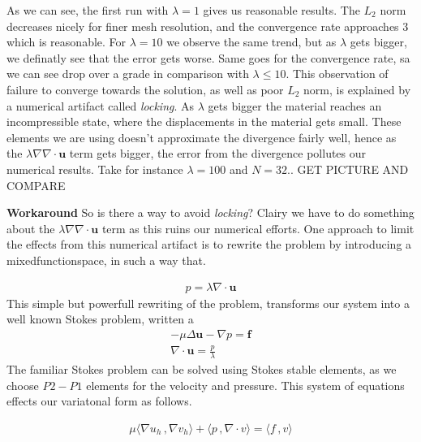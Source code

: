 \documentclass[a4paper,norsk]{article}
\begin{document}
As we can see, the first run with $\lambda = 1$ gives us reasonable results. The $L_2$ norm decreases nicely for finer mesh
resolution, and the convergence rate approaches 3 which is reasonable. For $\lambda = 10$ we observe the same trend, but as $\lambda$ gets bigger, we definatly see that the error gets worse. Same goes for the convergence rate, sa we can see drop over 
a grade in comparison with $\lambda \leq 10$. This observation of failure to converge towards the solution, as well as poor $L_2$ norm, is explained by a numerical artifact called \textit{locking}. As $\lambda$ gets bigger the material reaches an 
incompressible state, where the displacements in the material gets small.
These elements we are using doesn't approximate the divergence fairly well, hence as the 
$\lambda \nabla \nabla \cdot \textbf{u}$ term gets bigger, the error from the divergence pollutes our numerical results. Take for 
instance $\lambda = 100$ and $N = 32$.. GET PICTURE AND COMPARE


\textbf{Workaround}
So is there a way to avoid \textit{locking}? Clairy we have to do something about the $\lambda \nabla \nabla \cdot \textbf{u}$ term as this ruins our numerical efforts.
One approach to limit the effects from this numerical artifact is to rewrite
the problem by introducing a mixedfunctionspace, in such a way that.

\begin{align*}
p =  \lambda \nabla \cdot \textbf{u} 
\end{align*}
This simple but powerfull rewriting of the problem, transforms our system into a well known Stokes problem, written a
\begin{align*}
-\mu \Delta \textbf{u} - \nabla p = \textbf{f} \\
\nabla \cdot \textbf{u} = \frac{p}{\lambda}
\end{align*}
The familiar Stokes problem can be solved using Stokes stable elements, as we choose $P2-P1$ elements for the velocity and
pressure. This system of equations effects our variatonal form as follows.

\begin{align*}
\mu \langle \nabla u_h \,, \nabla v_h \rangle + \langle p \,, \nabla \cdot v \rangle 
= \langle f \,, v \rangle
\end{align*}


	
\end{document}
